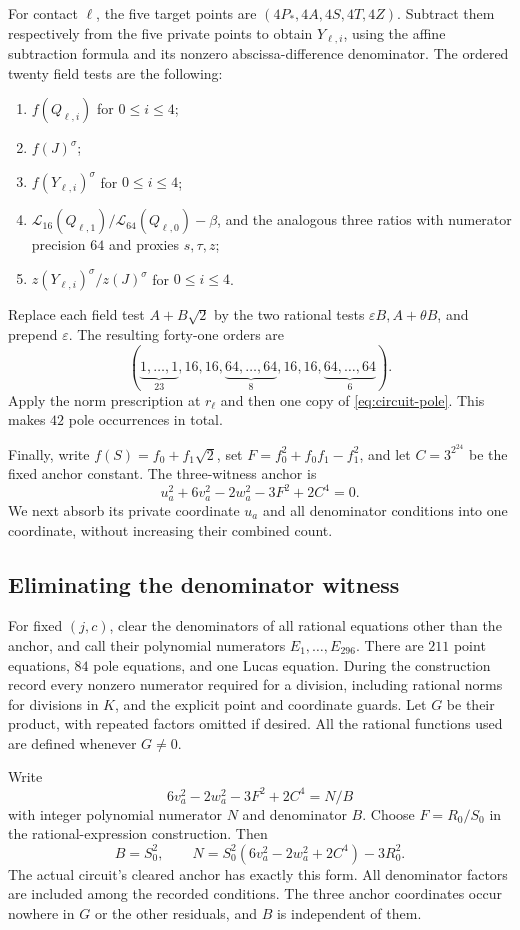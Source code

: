 \documentclass[11pt]{article}
\theoremstyle{definition}
\begin{document}
For contact $\ell$, the five target points are
$(4P_*,4A,4S,4T,4Z)$. Subtract them respectively from the five
private points to obtain $Y_{\ell,i}$, using the affine subtraction
formula and its nonzero abscissa-difference denominator. The ordered
twenty field tests are the following:
\begin{enumerate}
\item $f(Q_{\ell,i})$ for $0\leq i\leq4$;
\item $f(J)^\sigma$;
\item $f(Y_{\ell,i})^\sigma$ for $0\leq i\leq4$;
\item $\mathcal L_{16}(Q_{\ell,1})/\mathcal L_{64}(Q_{\ell,0})-\beta$,
and the analogous three ratios with numerator precision $64$ and
proxies $s,\tau,z$;
\item $z(Y_{\ell,i})^\sigma/z(J)^\sigma$ for $0\leq i\leq4$.
\end{enumerate}
Replace each field test $A+B\sqrt2$ by the two rational tests
$\varepsilon B,A+\theta B$, and prepend $\varepsilon$. The
resulting forty-one orders are
\[
 (\underbrace{1,\ldots,1}_{23},16,16,
 \underbrace{64,\ldots,64}_{8},16,16,
 \underbrace{64,\ldots,64}_{6}).
\]
Apply the norm prescription at $r_\ell$ and then one copy of
\eqref{eq:circuit-pole}. This makes $42$ pole occurrences in total.

Finally, write $f(S)=f_0+f_1\sqrt2$, set
$F=f_0^2+f_0f_1-f_1^2$, and let $C=3^{2^{24}}$ be the fixed
anchor constant. The three-witness anchor is
\[
 u_a^2+6v_a^2-2w_a^2-3F^2+2C^4=0.
\]
We next absorb its private coordinate $u_a$ and all denominator
conditions into one coordinate, without increasing their combined count.

\subsection{Eliminating the denominator witness}

For fixed $(j,c)$, clear the denominators of all rational equations
other than the anchor, and call their polynomial numerators
$E_1,\ldots,E_{296}$. There are $211$ point equations, $84$ pole
equations, and one Lucas equation. During the construction record every
nonzero numerator required for a division, including rational norms
for divisions in $K$, and the explicit point and coordinate guards.
Let $G$ be their product, with repeated factors omitted if desired.
All the rational functions used are defined whenever $G\ne0$.

Write
\[
 6v_a^2-2w_a^2-3F^2+2C^4=N/B
\]
with integer polynomial numerator $N$ and denominator $B$. Choose
$F=R_0/S_0$ in the rational-expression construction. Then
\[
 B=S_0^2,\qquad
 N=S_0^2(6v_a^2-2w_a^2+2C^4)-3R_0^2.
\]
The actual circuit's cleared anchor has exactly this form.
All denominator factors are included among the recorded conditions.
The three anchor coordinates occur nowhere in $G$ or the other
residuals, and $B$ is independent of them.
\end{document}
